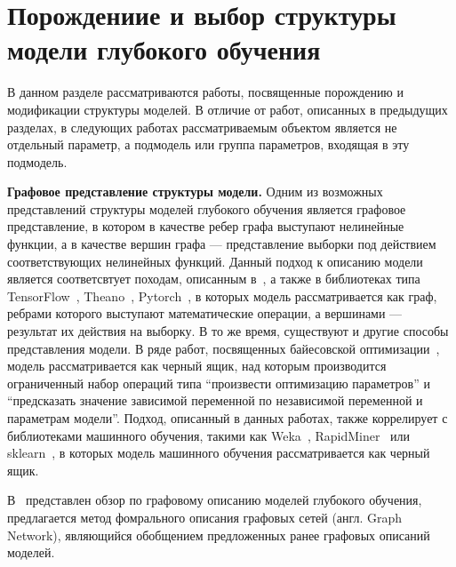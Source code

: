 \section{Порождениие и выбор структуры модели глубокого обучения}
В данном разделе рассматриваются работы, посвященные порождению и модификации структуры моделей. В отличие от работ, описанных в предыдущих разделах, в следующих работах рассматриваемым объектом является не отдельный параметр, а подмодель или группа параметров, входящая в эту подмодель.
 



\textbf{Графовое представление структуры модели. }
Одним из возможных представлений структуры моделей глубокого обучения является графовое представление, в котором в качестве ребер графа выступают нелинейные функции, а в качестве вершин графа --- представление выборки под действием соответствующих нелинейных функций. 
Данный подход к описанию модели является соответсвтует  походам, описанным в~\cite{vokov}, а также в библиотеках типа TensorFlow~\cite{tensorflow}, Theano~\cite{theano}, Pytorch~\cite{pytorch}, в которых модель рассматривается как граф, ребрами которого выступают математические операции, а вершинами --- результат их действия на выборку. 
 В то же время, существуют и другие способы представления модели. В ряде работ, посвященных байесовской оптимизации~\cite{snoek_deep,rbf_surrogate,bo_gp}, модель рассматривается как черный ящик, над которым производится ограниченный набор операций типа ``произвести оптимизацию параметров'' и ``предсказать значение зависимой переменной по независимой переменной и параметрам модели''.
Подход, описанный в данных работах, также коррелирует с  библиотеками машинного обучения, такими как Weka~\cite{weka}, RapidMiner~\cite{rapidminer} или sklearn~\cite{sklearn}, в которых модель машинного обучения рассматривается как черный ящик.

В~\cite{graphs} представлен обзор по графовому описанию моделей глубокого обучения, предлагается метод фомрального описания графовых сетей (англ. Graph Network), являющийся обобщением предложенных ранее графовых описаний моделей.

